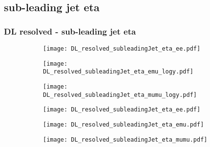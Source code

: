 \documentclass[aspectratio=169,8pt]{beamer}
\begin{document}
\subsection{sub-leading jet eta}
\begin{frame}
\frametitle{DL resolved - sub-leading jet eta}
\begin{figure}
\captionsetup[subfigure]{labelformat=empty}
\begin{subfigure}{0.32\textwidth}
\texttt{[image: DL\_resolved\_subleadingJet\_eta\_ee.pdf]}
\vspace*{-0.15cm}
\end{subfigure}
\hfil
\begin{subfigure}{0.32\textwidth}
\texttt{[image: DL\_resolved\_subleadingJet\_eta\_emu\_logy.pdf]}
\vspace*{-0.15cm}
\end{subfigure}
\hfil
\begin{subfigure}{0.32\textwidth}
\texttt{[image: DL\_resolved\_subleadingJet\_eta\_mumu\_logy.pdf]}
\vspace*{-0.15cm}
\end{subfigure}
\hfil
\begin{subfigure}{0.32\textwidth}
\texttt{[image: DL\_resolved\_subleadingJet\_eta\_ee.pdf]}
\vspace*{-0.15cm}
\end{subfigure}
\hfil
\begin{subfigure}{0.32\textwidth}
\texttt{[image: DL\_resolved\_subleadingJet\_eta\_emu.pdf]}
\vspace*{-0.15cm}
\end{subfigure}
\hfil
\begin{subfigure}{0.32\textwidth}
\texttt{[image: DL\_resolved\_subleadingJet\_eta\_mumu.pdf]}
\vspace*{-0.15cm}
\end{subfigure}
\hfil
\end{figure}
\end{frame}
\newpage
\end{document}
